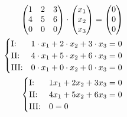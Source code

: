 \begin{align*}
    \begin{pmatrix}
        1 & 2 & 3 \\
        4 & 5 & 6 \\
        0 & 0 & 0
    \end{pmatrix} \cdot \begin{pmatrix}
                            x_1 \\ x_2 \\ x_3
                        \end{pmatrix} = \begin{pmatrix}
                                            0 \\ 0 \\ 0
                                        \end{pmatrix}                              \\
    \begin{cases}
        \text{I:\@}   & 1 \cdot x_1 + 2 \cdot x_2 + 3 \cdot x_3 = 0 \\
        \text{II:\@}  & 4 \cdot x_1 + 5 \cdot x_2 + 6 \cdot x_3 = 0 \\
        \text{III:\@} & 0 \cdot x_1 + 0 \cdot x_2 + 0 \cdot x_3 = 0
    \end{cases}                     \\
    \begin{cases}
        \text{I:\@}   & 1x_1 + 2x_2 + 3x_3 = 0 \\
        \text{II:\@}  & 4x_1 + 5x_2 + 6x_3 = 0 \\
        \text{III:\@} & 0 = 0
    \end{cases}
\end{align*}

